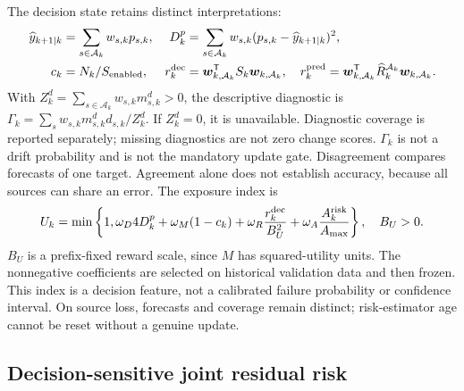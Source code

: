 \documentclass[10pt]{article}
\begin{document}
The decision state retains distinct interpretations:
\begin{align}
 \widehat y_{k+1|k}&=\sum_{s\in\mathcal A_k}w_{s,k}p_{s,k},&
 D_k^p&=\sum_{s\in\mathcal A_k}w_{s,k}(p_{s,k}-\widehat y_{k+1|k})^2,\\
 c_k&=N_k/S_{\rm enabled},&
 r_k^{\rm dec}&=\boldsymbol w_{k,\mathcal A_k}^{\mathsf T}
                   S_k\boldsymbol w_{k,\mathcal A_k},\quad
 r_k^{\rm pred}=\boldsymbol w_{k,\mathcal A_k}^{\mathsf T}
 \widehat R_k^{\mathcal A_k}\boldsymbol w_{k,\mathcal A_k}.
 \label{eq:fusion-state}
\end{align}
With $Z_k^d=\sum_{s\in\mathcal A_k}w_{s,k}m^d_{s,k}>0$, the descriptive
diagnostic is $\Gamma_k=\sum_s w_{s,k}m^d_{s,k}d_{s,k}/Z_k^d$.
If $Z_k^d=0$, it is unavailable. Diagnostic coverage is reported separately;
missing diagnostics are not zero change scores. $\Gamma_k$ is not a drift
probability and is not the mandatory update gate.
Disagreement compares forecasts of one target. Agreement alone does not
establish accuracy, because all sources can share an error.
The exposure index is
\begin{equation}
 U_k=\min\left\{1,\omega_D4D_k^p+\omega_M(1-c_k)
       +\omega_R\frac{r_k^{\rm dec}}{B_U^2}
       +\omega_A\frac{A_k^{\rm risk}}{A_{\max}}\right\},\quad B_U>0.
 \label{eq:decision-uncertainty}
\end{equation}
$B_U$ is a prefix-fixed reward scale, since $M$ has squared-utility units.
The nonnegative coefficients are selected on historical validation data and
then frozen. This index is a decision feature, not a calibrated failure
probability or confidence interval. On source loss, forecasts and coverage
remain distinct; risk-estimator age cannot be reset without a genuine update.


\subsection{Decision-sensitive joint residual risk}
\label{sec:decision-sensitive-risk}
\end{document}
